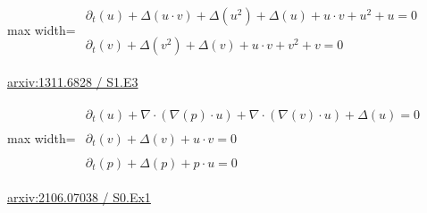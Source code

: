 \documentclass[10pt,a4paper]{article}
\begin{document}
\begin{minipage}{\linewidth}
\begin{center}\begin{adjustbox}{max width=\linewidth}$\displaystyle\begin{gathered}\begin{gathered}\partial_{t}(u)+\Delta(u\cdot v)+\Delta(u^{2})+\Delta(u)+u\cdot v+u^{2}+u=0\end{gathered}\\[5pt]\begin{gathered}\partial_{t}(v)+\Delta(v^{2})+\Delta(v)+u\cdot v+v^{2}+v=0\end{gathered}\end{gathered}$\end{adjustbox}\end{center}
{\small \href{https://arxiv.org/html/1311.6828#S1.E3}{arxiv:1311.6828 / S1.E3}}\par
\end{minipage}\par\vspace{7mm}

\begin{minipage}{\linewidth}
\begin{center}\begin{adjustbox}{max width=\linewidth}$\displaystyle\begin{gathered}\begin{gathered}\partial_{t}(u)+\nabla\cdot(\nabla(p)\cdot u)+\nabla\cdot(\nabla(v)\cdot u)+\Delta(u)=0\end{gathered}\\[5pt]\begin{gathered}\partial_{t}(v)+\Delta(v)+u\cdot v=0\end{gathered}\\[5pt]\begin{gathered}\partial_{t}(p)+\Delta(p)+p\cdot u=0\end{gathered}\end{gathered}$\end{adjustbox}\end{center}
{\small \href{https://arxiv.org/html/2106.07038#S0.Ex1}{arxiv:2106.07038 / S0.Ex1}}\par
\end{minipage}\par\vspace{7mm}
\end{document}
